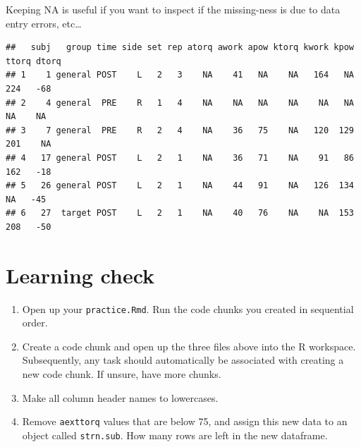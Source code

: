 \documentclass[
]{book}
\newenvironment{Shaded}{\begin{snugshade}}{\end{snugshade}}
\newcommand{\CommentTok}[1]{\textcolor[rgb]{0.56,0.35,0.01}{\textit{#1}}}
\newcommand{\KeywordTok}[1]{\textcolor[rgb]{0.13,0.29,0.53}{\textbf{#1}}}
\newcommand{\NormalTok}[1]{#1}
\newcommand{\OperatorTok}[1]{\textcolor[rgb]{0.81,0.36,0.00}{\textbf{#1}}}
\newcommand{\StringTok}[1]{\textcolor[rgb]{0.31,0.60,0.02}{#1}}
\begin{document}
Keeping NA is useful if you want to inspect if the missing-ness is due to data entry errors, etc\ldots{}

\begin{Shaded}
\end{Shaded}

\begin{verbatim}
##   subj   group time side set rep atorq awork apow ktorq kwork kpow ttorq dtorq
## 1    1 general POST    L   2   3    NA    41   NA    NA   164   NA   224   -68
## 2    4 general  PRE    R   1   4    NA    NA   NA    NA    NA   NA    NA    NA
## 3    7 general  PRE    R   2   4    NA    36   75    NA   120  129   201    NA
## 4   17 general POST    L   2   1    NA    36   71    NA    91   86   162   -18
## 5   26 general POST    L   2   1    NA    44   91    NA   126  134    NA   -45
## 6   27  target POST    L   2   1    NA    40   76    NA    NA  153   208   -50
\end{verbatim}

\hypertarget{learning-check}{%
\section*{Learning check}\label{learning-check}}

\begin{enumerate}
\def\labelenumi{\arabic{enumi}.}
\item
  Open up your \texttt{practice.Rmd}. Run the code chunks you created in sequential order.
\item
  Create a code chunk and open up the three files above into the R workspace. Subsequently, any task should automatically be associated with creating a new code chunk. If unsure, have more chunks.
\item
  Make all column header names to lowercases.
\item
  Remove \texttt{aexttorq} values that are below 75, and assign this new data to an object called \texttt{strn.sub}. How many rows are left in the new dataframe.
\end{enumerate}
\end{document}
